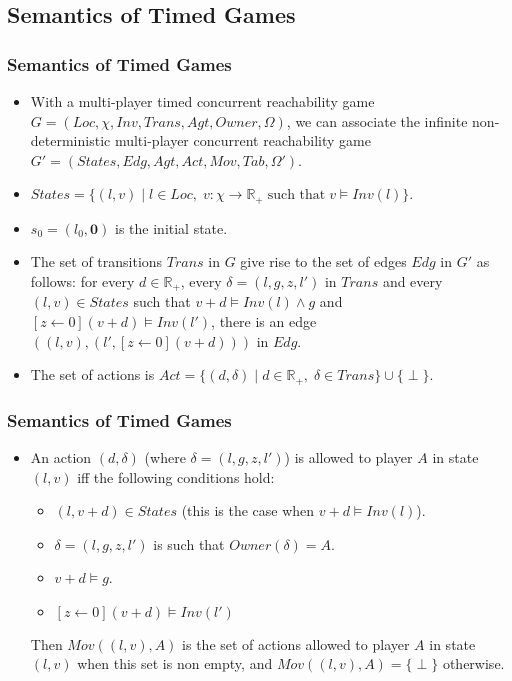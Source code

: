 \documentclass{beamer}
\begin{document}
\subsection*{Semantics of Timed Games}
\begin{frame}
\frametitle{Semantics of Timed Games}
  \begin{itemize}
	\item With a multi-player timed  concurrent reachability game $G = (Loc, \chi, Inv, Trans, Agt, Owner, \Omega)$, we can associate the infinite non-deterministic multi-player concurrent reachability game $G' = (States, Edg, Agt, Act, Mov, Tab, \Omega')$.
 	\item $States = \lbrace (l,v) \; \vert \; l \in Loc, \; v: \chi \rightarrow \mathbb{R}_{+} \; \text{such that} \; v \models Inv(l) \rbrace$.
 	\item $s_{0} = (l_{0}, \textbf{0})$ is the initial state.
 	\item The set of transitions $Trans$ in $G$ give rise to the set of edges $Edg$ in $G'$ as follows: for every $d \in \mathbb{R}_{+}$, every $\delta = (l, g, z, l')$ in $Trans$ and every $(l, v) \in States$ such that $v + d \models Inv(l) \wedge g$ and $[z \leftarrow 0](v + d) \models Inv(l')$, there is an edge $((l, v), (l', [z \leftarrow 0](v + d)))$ in $Edg$.
  	\item The set of actions is $Act = \lbrace (d, \delta) \; \vert \; d \in \mathbb{R}_{+}, \; \delta \in Trans \rbrace \cup \lbrace \perp \rbrace$.
  \end{itemize}
\end{frame}

\begin{frame}
\frametitle{Semantics of Timed Games}
  \begin{itemize}
	\item An action $(d, \delta)$ (where $\delta = (l, g, z, l')$) is allowed to player $A$ in state $(l, v)$ iff the following conditions hold:
\begin{itemize}
\item $(l, v + d) \in States$ (this is the case when $v + d \models Inv(l)$).
\item $\delta = (l, g, z, l')$ is such that $Owner(\delta) = A$.
\item $v + d \models g$.
\item $[z \leftarrow 0](v + d) \models Inv(l')$
\end{itemize}
Then $Mov((l, v), A)$ is the set of actions allowed to player $A$ in state $(l, v)$ when this set is non empty, and $Mov((l, v), A) = \lbrace \perp \rbrace$ otherwise.
  \end{itemize}
\end{frame}
\end{document}
